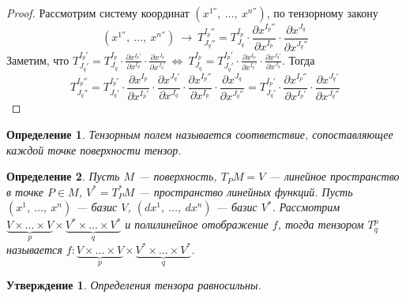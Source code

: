 \documentclass[12pt]{article}
\theoremstyle{plain}
\newtheorem{subtheorem}{Утверждение}[section]
\newtheorem{definition}{Определение}[section]
\begin{document}
    \begin{proof}
        Рассмотрим систему координат $(x^{1''}, \ \ldots, \ x^{n''})$, по тензорному закону
        $$(x^{1''}, \ \ldots, \ x^{n''}) \ \longrightarrow \ T^{I_p''}_{J_q''}=T^{I_p}_{J_q}\cdot\frac{\partial x^{I_p''}}{\partial x^{I_p}}\cdot\frac{\partial x^{J_q}}{\partial x^{J_q''}}$$
        Заметим, что $T^{I_p'}_{J_q'}=T^{I_p}_{J_q}\cdot\frac{\partial x^{I_p'}}{\partial x^{I_p}}\cdot\frac{\partial x^{J_q}}{\partial x^{J_q'}} \ \Longleftrightarrow \ T^{I_p}_{J_q}=T^{I_p'}_{J_q'}\cdot\frac{\partial x^{I_p}}{\partial x^{I_p'}}\cdot\frac{\partial x^{J_q'}}{\partial x^{J_q}}$. Тогда
        $$T^{I_p''}_{J_q''}=T^{I_p'}_{J_q'}\cdot\frac{\partial x^{I_p}}{\partial x^{I_p'}}\cdot\frac{\partial x^{J_q'}}{\partial x^{J_q}}\cdot\frac{\partial x^{I_p''}}{\partial x^{I_p}}\cdot\frac{\partial x^{J_q}}{\partial x^{J_q''}}=T^{I_p'}_{J_q'}\cdot\frac{\partial x^{I_p''}}{\partial x^{I_p'}}\cdot\frac{\partial x^{J_q'}}{\partial x^{J_q''}}$$
    \end{proof}
    \begin{definition}
        Тензорным полем называется соответствие, сопоставляющее каждой точке поверхности тензор.
    \end{definition}
    \begin{definition}
        Пусть $M$ --- поверхность, $T_PM=V$ --- линейное пространство в точке $P\in M$, $V^*=T_P^*M$ --- пространство линейных функций. Пусть $(x^1, \ \ldots, \ x^n)$ --- базис $V$, $(dx^1, \ \ldots, \ dx^n)$ --- базис $V^*$. Рассмотрим $\underbrace{V\times \dots\times V}_p \times \underbrace{V^*\times \dots\times V^*}_q$ и полилинейное отображение $f$, тогда тензором $T^p_q$ называется $f:\underbrace{V\times \dots\times V}_p \times \underbrace{V^*\times \dots\times V^*}_q$.
    \end{definition}
    \begin{subtheorem}
        Определения тензора равносильны.
    \end{subtheorem}
\end{document}
